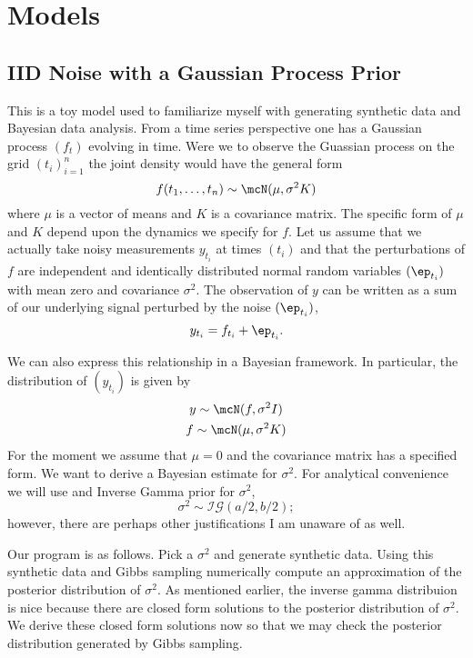 \documentclass{report}
\begin{document}
\chapter{Models}

\section{IID Noise with a Gaussian Process Prior}

This is a toy model used to familiarize myself with generating synthetic data and Bayesian data analysis.  From a time series perspective one has a Gaussian process $(f_t)$ evolving in time.  Were we to observe the Guassian process on the grid $(t_i)_{i=1}^n$ the joint density would have the general form
\[
f(t_1, \ldots, t_n) \sim \mcN(\mu, \sigma^2 K)
\]
where $\mu$ is a vector of means and $K$ is a covariance matrix.  The specific form of $\mu$ and $K$ depend upon the dynamics we specify for $f$.  Let us assume that we actually take noisy measurements $y_{t_i}$ at times $(t_i)$ and that the perturbations of $f$ are independent and identically distributed normal random variables $(\ep_{t_i})$ with mean zero and covariance $\sigma^2$.  The observation of $y$ can be written as a sum of our underlying signal perturbed by the noise $(\ep_{t_i})$,
\[
y_{t_i} = f_{t_i} + \ep_{t_i}.
\]

We can also express this relationship in a Bayesian framework.  In particular, the distribution of $(y_{t_i})$ is given by
\begin{gather*}
y \sim \mcN(f, \sigma^2 I) \\
f \sim \mcN(\mu, \sigma^2 K)
\end{gather*}
For the moment we assume that $\mu = 0$ and the covariance matrix has a specified form.  We want to derive a Bayesian estimate for $\sigma^2$.  For analytical convenience we will use and Inverse Gamma prior for $\sigma^2$,
\[
\sigma^2 \sim \mathcal{IG}(a/2,b/2);
\]
however, there are perhaps other justifications I am unaware of as well.  

Our program is as follows.  Pick a $\sigma^2$ and generate synthetic data.  Using this synthetic data and Gibbs sampling numerically compute an approximation of the posterior distribution of $\sigma^2$.  As mentioned earlier, the inverse gamma distribuion is nice because there are closed form solutions to the posterior distribution of $\sigma^2$.  We derive these closed form solutions now so that we may check the posterior distribution generated by Gibbs sampling.
\end{document}
